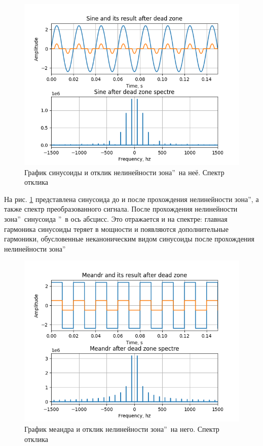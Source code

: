 \begin{figure}[H]
	\centering
	\includegraphics[width=0.75\linewidth]{body/images/sine-after-dead-zone-and-its-spectre.png}
	\caption{График синусоиды и отклик нелинейности
	 зона\textquotedblright\ на неё. Спектр отклика}
	\label{fig:16}
\end{figure}

На рис. \ref{fig:16} представлена синусоида до и после прохождения
нелинейности  зона\textquotedblright, а
также спектр преобразованного сигнала. После прохождения
нелинейности  зона\textquotedblright\ 
синусоида \textquotedblright\ в ось
абсцисс. Это отражается и на спектре: главная гармоника синусоиды
теряет в мощности и появляются дополнительные гармоники, обусловенные
неканоническим видом синусоиды после прохождения нелинейности
 зона\textquotedblright

\begin{figure}[H]
	\centering
	\includegraphics[width=0.75\linewidth]{body/images/meandr-after-dead-zone-and-its-spectre.png}
	\caption{График меандра и отклик нелинейности
	 зона\textquotedblright\ на него. Спектр отклика}
	\label{fig:17}
\end{figure}


